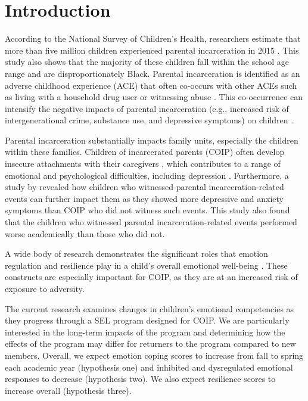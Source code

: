 \section{Introduction}

According to the National Survey of Children’s Health, researchers estimate that more than five million children experienced parental incarceration in 2015 \citep{murphey2015parents}. This study also shows that the majority of these children fall within the school age range and are disproportionately Black. Parental incarceration is identified as an adverse childhood experience (ACE) that often co-occurs with other ACEs such as living with a household drug user or witnessing abuse \citep{scott2013interrelation}. This co-occurrence can intensify the negative impacts of parental incarceration (e.g., increased risk of intergenerational crime, substance use, and depressive symptoms) on children \citep{poehlmann2019research}. 

Parental incarceration substantially impacts family units, especially the children within these families. Children of incarcerated parents (COIP) often develop insecure attachments with their caregivers \citep{murray2010parental}, which contributes to a range of emotional and psychological difficulties, including depression \citep{spruit2020relation}. Furthermore, a study by \citet{dallaire2010relation} revealed how children who witnessed parental incarceration-related events can further impact them as they showed more depressive and anxiety symptoms than COIP who did not witness such events. This study also found that the children who witnessed parental incarceration-related events performed worse academically than those who did not.

A wide body of research demonstrates the significant roles that emotion regulation and resilience play in a child's overall emotional well-being \citep{macklem2010importance, mihic2018importance, morie2022process}. These constructs are especially important for COIP, as they are at an increased risk of exposure to adversity.

The current research examines changes in children's emotional competencies as they progress through a SEL program designed for COIP. We are particularly interested in the long-term impacts of the program and determining how the effects of the program may differ for returners to the program compared to new members. Overall, we expect emotion coping scores to increase from fall to spring each academic year (hypothesis one) and inhibited and dysregulated emotional responses to decrease (hypothesis two). We also expect resilience scores to increase overall (hypothesis three). 